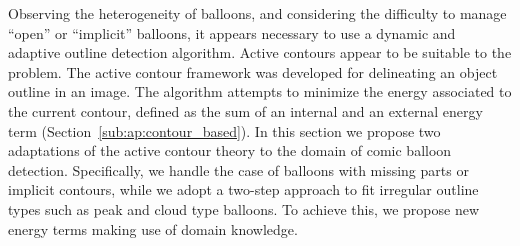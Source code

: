 Observing the heterogeneity of balloons, and considering the difficulty to manage ``open'' or ``implicit'' balloons, it appears necessary to use a dynamic and adaptive outline detection algorithm.
Active contours appear to be suitable to the problem.
The active contour framework was developed for delineating an object outline in an image.
The algorithm attempts to minimize the energy associated to the current contour, defined as the sum of an internal and an external energy term (Section~\ref{sub:ap:contour_based}). 
In this section we propose two adaptations of the active contour theory to the domain of comic balloon detection.
Specifically, we handle the case of balloons with missing parts or implicit contours, while we adopt a two-step approach to fit irregular outline types such as peak and cloud type balloons. 
To achieve this, we propose new energy terms making use of domain knowledge.





